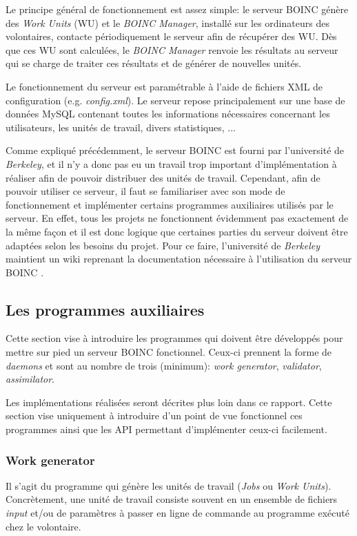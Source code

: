 \documentclass[a4paper, 12pt]{report}
\begin{document}
Le principe général de fonctionnement est assez simple: le serveur \textsc{BOINC} génère des \textit{Work Units} (WU) et le \textit{BOINC Manager}, installé sur les ordinateurs des volontaires, contacte périodiquement le serveur afin de récupérer des WU. Dès que ces WU sont calculées, le \textit{BOINC Manager} renvoie les résultats au serveur qui se charge de traiter ces résultats et de générer de nouvelles unités. 

Le fonctionnement du serveur est paramétrable à l'aide de fichiers XML de configuration (e.g. \textit{config.xml}). Le serveur repose principalement sur une base de données MySQL contenant toutes les informations nécessaires concernant les utilisateurs, les unités de travail, divers statistiques, ...

Comme expliqué précédemment, le serveur \textsc{BOINC} est fourni par l'université de \textit{Berkeley}, et il n'y a donc pas eu un travail trop important d'implémentation à réaliser afin de pouvoir distribuer des unités de travail. Cependant, afin de pouvoir utiliser ce serveur, il faut se familiariser avec son mode de fonctionnement et implémenter certains programmes auxiliaires utilisés par le serveur. En effet, tous les projets ne fonctionnent évidemment pas exactement de la même façon et il est donc logique que certaines parties du serveur doivent être adaptées selon les besoins du projet. Pour ce faire, l'université de \textit{Berkeley} maintient un wiki reprenant la documentation nécessaire à l'utilisation du serveur \textsc{BOINC} \cite{WIKI}.

\subsection{Les programmes auxiliaires}
\label{daemons}
Cette section vise à introduire les programmes qui doivent être développés pour mettre sur pied un serveur \textsc{BOINC} fonctionnel. Ceux-ci prennent la forme de \textit{daemons} et sont au nombre de trois (minimum): \textit{work generator}, \textit{validator}, \textit{assimilator}. 

Les implémentations réalisées seront décrites plus loin dans ce rapport. Cette section vise uniquement à introduire d'un point de vue fonctionnel ces programmes ainsi que les API permettant d'implémenter ceux-ci facilement.

\subsubsection{Work generator}
\label{workgeneratorboinc}
Il s'agit du programme qui génère les unités de travail (\textit{Jobs} ou \textit{Work Units}). Concrètement, une unité de travail consiste souvent en un ensemble de fichiers \textit{input} et/ou de paramètres à passer en ligne de commande au programme exécuté chez le volontaire. 
\end{document}
